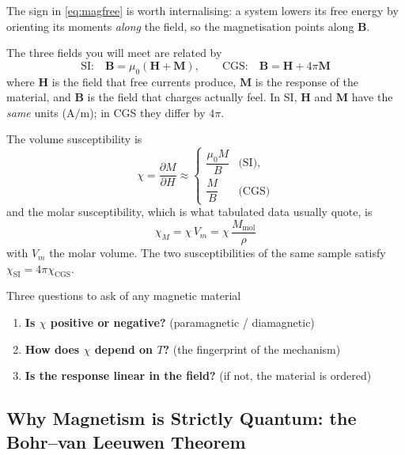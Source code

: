 \documentclass[11pt,a4paper]{article}
\newcommand{\vb}[1]{\mathbf{#1}}
\begin{document}
The sign in \eqref{eq:magfree} is worth internalising: a system lowers its free energy by orienting its moments \emph{along} the field, so the magnetisation points along $\vb{B}$.

The three fields you will meet are related by
\begin{equation}
    \text{SI:}\quad \vb{B} = \mu_0(\vb{H} + \vb{M}),
    \qquad
    \text{CGS:}\quad \vb{B} = \vb{H} + 4\pi\vb{M}
    \label{eq:bhM}
\end{equation}
where $\vb{H}$ is the field that free currents produce, $\vb{M}$ is the response of the material, and $\vb{B}$ is the field that charges actually feel. In SI, $\vb{H}$ and $\vb{M}$ have the \emph{same} units ($\mathrm{A/m}$); in CGS they differ by $4\pi$.

The volume susceptibility is
\begin{equation}
    \chi = \frac{\partial M}{\partial H} \approx
    \begin{cases}
        \dfrac{\mu_0 M}{B} & \text{(SI)},\\[6pt]
        \dfrac{M}{B} & \text{(CGS)}
    \end{cases}
    \label{eq:chi}
\end{equation}
and the molar susceptibility, which is what tabulated data usually quote, is
\begin{equation}
    \chi_M = \chi\,V_m = \chi\,\frac{M_{\mathrm{mol}}}{\rho}
    \label{eq:chiM}
\end{equation}
with $V_m$ the molar volume. The two susceptibilities of the same sample satisfy $\chi_{\mathrm{SI}} = 4\pi\chi_{\mathrm{CGS}}$.

\begin{takeawaybox}{Three questions to ask of any magnetic material}
\begin{enumerate}[leftmargin=1.4cm, itemsep=1pt]
    \item \textbf{Is $\chi$ positive or negative?} (paramagnetic / diamagnetic)
    \item \textbf{How does $\chi$ depend on $T$?} (the fingerprint of the mechanism)
    \item \textbf{Is the response linear in the field?} (if not, the material is ordered)
\end{enumerate}
\end{takeawaybox}

\subsection{Why Magnetism is Strictly Quantum: the Bohr--van Leeuwen Theorem}
\end{document}
